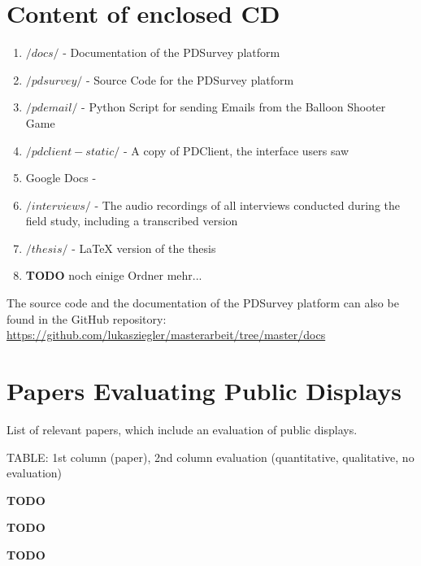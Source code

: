 \section{Content of enclosed CD}
\label{appendix:cd-contents}


    \begin{enumerate}
    \item $/docs/$ - Documentation of the PDSurvey platform
    \item $/pdsurvey/$ - Source Code for the PDSurvey platform
    \item $/pdemail/$ - Python Script for sending Emails from the Balloon Shooter Game
    \item $/pdclient-static/$ - A copy of PDClient, the interface users saw
    \item Google Docs - 
    \item $/interviews/$ - The audio recordings of all interviews conducted during the field study, including a transcribed version
    \item $/thesis/$ - LaTeX version of the thesis
    \item \textbf{TODO} noch einige Ordner mehr...
    \end{enumerate}

  The source code and the documentation of the PDSurvey platform can also be found in the GitHub repository: \url{https://github.com/lukasziegler/masterarbeit/tree/master/docs}



\cleardoublepage
\section{Papers Evaluating Public Displays}
  
  List of relevant papers, which include an evaluation of public displays.

  TABLE: 1st column (paper), 2nd column evaluation (quantitative, qualitative, no evaluation)

  \textbf{TODO}

  \textbf{TODO}

  \textbf{TODO}









\clearpage

\label{appendix:interviews}

